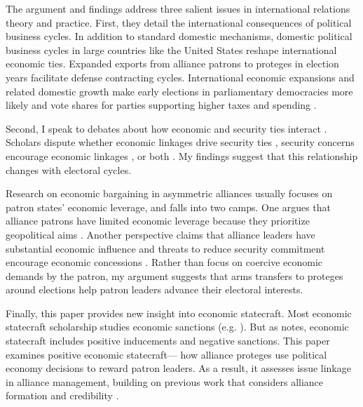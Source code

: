 \documentclass[12pt]{article}
\begin{document}
The argument and findings address three salient issues in international relations theory and practice. 
First, they detail the international consequences of political business cycles. 
In addition to standard domestic mechanisms, domestic political business cycles in large countries like the United States reshape international economic ties.
Expanded exports from alliance patrons to proteges in election years facilitate defense contracting cycles.
International economic expansions and related domestic growth make early elections in parliamentary democracies more likely \citep{Kayser2006} and vote shares for parties supporting higher taxes and spending \citep{Kayser2009}.


Second, I speak to debates about how economic and security ties interact \citep{Mastanduno2009, Poast2019}. 
Scholars dispute whether economic linkages drive security ties \citep{BiglaiserDeRouen2007, Fordham2010, Kimball2010}, security concerns encourage economic linkages \citep{Gowa1995, Li2003, LongLeeds2006, GowaMansfield2004}, or both \citep{BiglaiserDeRouen2009, KinneBunte2018}. 
My findings suggest that this relationship changes with electoral cycles.


Research on economic bargaining in asymmetric alliances usually focuses on patron states' economic leverage, and falls into two camps. 
One argues that alliance patrons have limited economic leverage because they prioritize geopolitical aims \citep{Drezner2013, WolfordKim2017}.
Another perspective claims that alliance leaders have substantial economic influence \citep{Norrlof2010, Brooksetal2013} and threats to reduce security commitment encourage economic concessions \citep[pg. 122]{Oatley2015}.
Rather than focus on coercive economic demands by the patron, my argument suggests that arms transfers to proteges around elections help patron leaders advance their electoral interests.


Finally, this paper provides new insight into economic statecraft. 
Most economic statecraft scholarship studies economic sanctions (e.g. \citep{Marinov2005, Allen2008, Escriba-FolchWright2010}).
But as \citep{Baldwin2020} notes, economic statecraft includes positive inducements and negative sanctions. 
This paper examines positive economic statecraft--- how alliance proteges use political economy decisions to reward patron leaders.
As a result, it assesses issue linkage in alliance management, building on previous work that considers alliance formation \citep{Poast2012} and credibility \citep{Davis2008, Poast2013}. 
\end{document}

